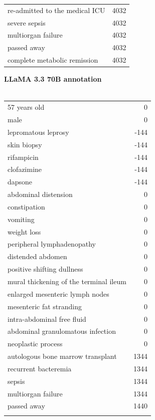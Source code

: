 \begin{figure}[!htbp]
\begin{minipage}[!htbp]{0.49\textwidth}
\begin{tabular}{P{0.75\textwidth}r}
            re-admitted to the medical ICU & 4032 \\
            severe sepsis & 4032 \\
            multiorgan failure & 4032 \\
            passed away & 4032 \\
            complete metabolic remission & 4032 \\
        \end{tabular}
    \end{minipage}
    \begin{minipage}[!htbp]{0.49\textwidth}
    \footnotesize
        \textbf{LLaMA 3.3 70B annotation} \\ \\
        \footnotesize
        \begin{tabular}{P{0.75\textwidth}r}
            57 years old & 0 \\
            male & 0 \\
            lepromatous leprosy & -144 \\
            skin biopsy & -144 \\
            rifampicin & -144 \\
            clofazimine & -144 \\
            dapsone & -144 \\
            abdominal distension & 0 \\
            constipation & 0 \\
            vomiting & 0 \\
            weight loss & 0 \\
            peripheral lymphadenopathy & 0 \\
            distended abdomen & 0 \\
            positive shifting dullness & 0 \\
            mural thickening of the terminal ileum & 0 \\
            enlarged mesenteric lymph nodes & 0 \\
            mesenteric fat stranding & 0 \\
            intra-abdominal free fluid & 0 \\
            abdominal granulomatous infection & 0 \\
            neoplastic process & 0 \\
            autologous bone marrow transplant & 1344 \\
            recurrent bacteremia & 1344 \\
            sepsis & 1344 \\
            multiorgan failure & 1344 \\
            passed away & 1440 \\
            & 
        \end{tabular}
    \end{minipage}
\end{figure}
